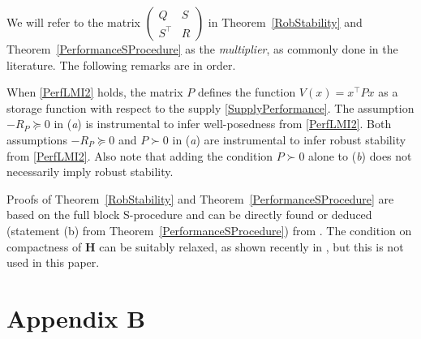 \documentclass[11pt,a4paper,oneside,DIV=12,headings=small]{scrartcl}
\theoremstyle{plain}
\begin{document}
We will refer to the matrix $\begin{pmatrix} Q & S \\ S^\top & R \end{pmatrix}$ in Theorem~\ref{RobStability} and Theorem~\ref{PerformanceSProcedure} as the \emph{multiplier}, as commonly done in the literature. The following remarks are in order.

When \eqref{PerfLMI2} holds, the matrix $P$ defines the function $V(x)=x^\top P x$ as a storage function with respect to the supply \eqref{SupplyPerformance}.
The assumption $-R_P \succeq 0$ in (\emph{a}) is instrumental to infer well-posedness from \eqref{PerfLMI2}. Both assumptions $-R_P \succeq 0$ and $P \succ 0$ in (\emph{a}) are instrumental to infer robust stability from \eqref{PerfLMI2}. Also note that adding the condition $P\succ 0$ alone to (\emph{b}) does not necessarily imply robust stability. 


Proofs of Theorem~\ref{RobStability} and Theorem~\ref{PerformanceSProcedure} are based on the full block S-procedure and can be directly found or deduced (statement (b) from Theorem~\ref{PerformanceSProcedure}) from \cite{SchererLPV, SchererFromBook}. 
The condition on compactness of $\mathbf{H}$ can be suitably relaxed, as shown recently in \cite{JokicNakic_Automatica}, but this is not used in this paper. 




\section*{Appendix B}
\label{Appendix_B}
\end{document}
